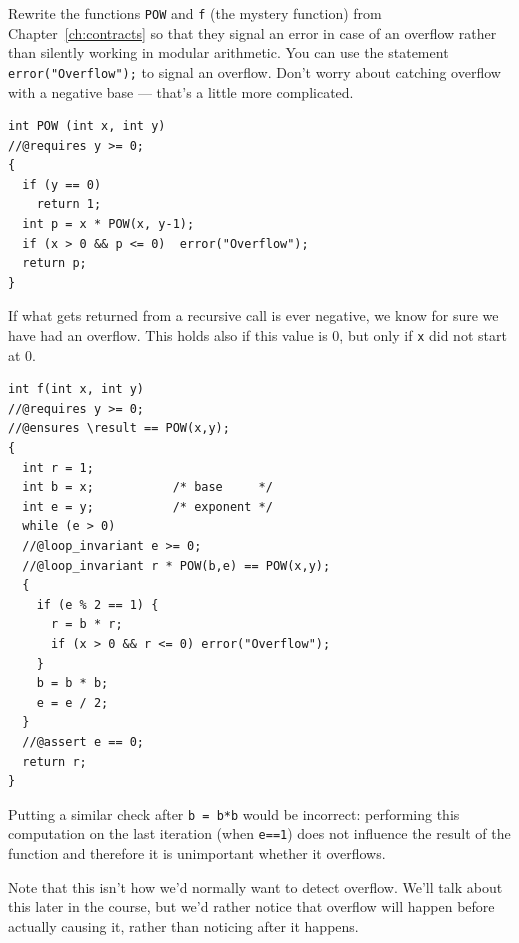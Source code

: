 \begin{flex}
\begin{exercise}%
\label{ex:fast_pow-overflow}
  Rewrite the functions \lstinline'POW' and \lstinline'f' (the mystery
  function) from Chapter~\ref{ch:contracts} so that they signal an
  error in case of an overflow rather than silently working in modular
  arithmetic.  You can use the statement
  \lstinline'error("Overflow");' to signal an overflow. Don't worry about
  catching overflow with a negative base --- that's a little more
  complicated.
\end{exercise}

\begin{solution}
\label{ex:fast_pow-overflow-solved}
\begin{lstlisting}[language={[C0]C}]
int POW (int x, int y)
//@requires y >= 0;
{
  if (y == 0)
    return 1;
  int p = x * POW(x, y-1);
  if (x > 0 && p <= 0)  error("Overflow");
  return p;
}
\end{lstlisting}
If what gets returned from a recursive call is ever negative, we know
for sure we have had an overflow.  This holds also if this value is
0, but only if \lstinline'x' did not start at 0.

\begin{lstlisting}[language={[C0]C}]
int f(int x, int y)
//@requires y >= 0;
//@ensures \result == POW(x,y);
{
  int r = 1;
  int b = x;           /* base     */
  int e = y;           /* exponent */
  while (e > 0)
  //@loop_invariant e >= 0;
  //@loop_invariant r * POW(b,e) == POW(x,y);
  {
    if (e % 2 == 1) {
      r = b * r;
      if (x > 0 && r <= 0) error("Overflow");
    }
    b = b * b;
    e = e / 2;
  }
  //@assert e == 0;
  return r;
}
\end{lstlisting}
Putting a similar check after \lstinline'b = b*b' would be incorrect:
performing this computation on the last iteration (when
\lstinline'e==1') does not influence the result of the function and
therefore it is unimportant whether it overflows.

Note that this isn't how we'd normally want to detect overflow.
We'll talk about this later in the course, but we'd rather
notice that overflow will happen before actually causing it,
rather than noticing after it happens.
\end{solution}
\end{flex}


\printsolutions
% 
% 
